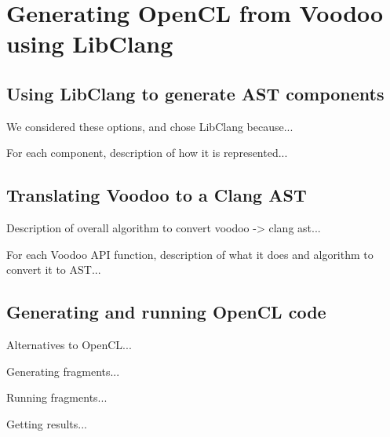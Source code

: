 \section{Generating OpenCL from Voodoo using LibClang}

\subsection{Using LibClang to generate AST components}

We considered these options, and chose LibClang because...

For each component, description of how it is represented...

\subsection{Translating Voodoo to a Clang AST}

Description of overall algorithm to convert voodoo -> clang ast...

For each Voodoo API function, description of what it does and algorithm to convert it to AST...

\subsection{Generating and running OpenCL code}

Alternatives to OpenCL...

Generating fragments...

Running fragments...

Getting results...
